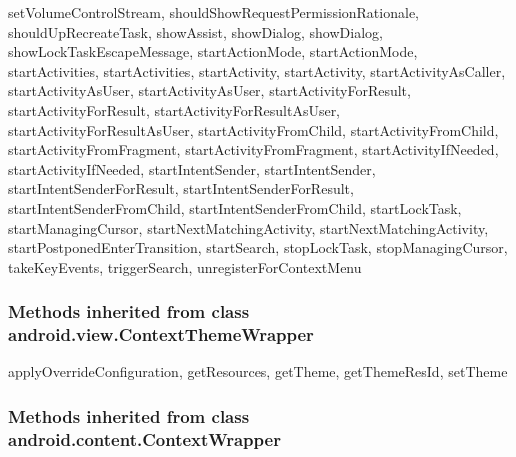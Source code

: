 setVolumeControlStream, shouldShowRequestPermissionRationale, shouldUpRecreateTask, showAssist, showDialog, showDialog, showLockTaskEscapeMessage, startActionMode, startActionMode, startActivities, startActivities, startActivity, startActivity, startActivityAsCaller, startActivityAsUser, startActivityAsUser, startActivityForResult, startActivityForResult, startActivityForResultAsUser, startActivityForResultAsUser, startActivityFromChild, startActivityFromChild, startActivityFromFragment, startActivityFromFragment, startActivityIfNeeded, startActivityIfNeeded, startIntentSender, startIntentSender, startIntentSenderForResult, startIntentSenderForResult, startIntentSenderFromChild, startIntentSenderFromChild, startLockTask, startManagingCursor, startNextMatchingActivity, startNextMatchingActivity, startPostponedEnterTransition, startSearch, stopLockTask, stopManagingCursor, takeKeyEvents, triggerSearch, unregisterForContextMenu\\

\subsubsection{Methods inherited from class android.view.ContextThemeWrapper}

applyOverrideConfiguration, getResources, getTheme, getThemeResId, setTheme\\

\subsubsection{Methods inherited from class android.content.ContextWrapper}

